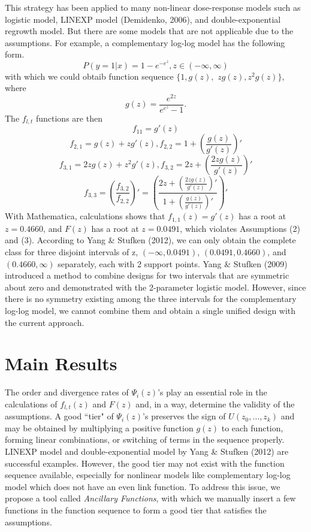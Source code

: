 \documentclass[12pt]{TD-CJS}
\begin{document}
 This strategy has been applied to many non-linear dose-response models such as logistic model, LINEXP model (Demidenko, 2006), and double-exponential regrowth model. But there are some models that are not applicable due to the assumptions. For example, a complementary log-log model has the following form. \[P(y=1|x) = 1-e^{-e^{z}}, z\in(-\infty,\infty)\] with which we could obtaib function sequence $\{1,g(z),$ $zg(z),z^2g(z)\}$, where \[g(z)=\frac{e^{2z}}{e^{e^z}-1}.\] 
 {\color{blue}The $f_{l,t}$ functions are then\[f_{11} = g'(z)\]
\[f_{2,1} = g(z)+zg'(z), f_{2,2} = 1+ (\frac{g(z)}{g'(z)})'\]
\[f_{3,1} = 2zg(z)+z^2g'(z), f_{3,2} = 2z+ (\frac{2zg(z)}{g'(z)})'\]
\[f_{3,3} = (\frac{ f_{3,2}}{ f_{2,2}})' =  (\frac{ 2z+ (\frac{2zg(z)}{g'(z)})'}{ 1+ (\frac{g(z)}{g'(z)})'})'  \]}
 With Mathematica, calculations shows that $f_{1,1}(z) = g'(z)$ has a root at $z=0.4660$, and $F(z)$ has a root at $z=0.0491$, which violates Assumptions (2) and (3). According to Yang \& Stufken (2012), we can only obtain the complete class for three disjoint intervals of z, $(-\infty, 0.0491)$, $(0.0491, 0.4660)$, and $(0.4660,\infty)$ separately, each with 2 support points. Yang \& Stufken (2009) introduced a method to combine designs for two intervals that are symmetric about zero and demonstrated with the 2-parameter logistic model. However, since there is no symmetry existing among the three intervals for the complementary log-log model, we cannot combine them and obtain a single unified design with the current approach.

 
\section{Main Results}\label{main}
The order and divergence rates of $\Psi_i(z)$'s play an essential role in the calculations of $f_{l,t}(z)$ and $F(z)$ and, in a way, determine the validity of the assumptions. A good ``tier" of $\Psi_i(z)$'s preserves the sign of $U(z_0,\ldots,z_k)$ and may be obtained by multiplying a positive function $g(z)$ to each function, forming linear combinations, or switching of terms in the sequence properly. LINEXP model and double-exponential model by Yang \& Stufken (2012) are successful examples. However, the good tier may not exist with the function sequence available, especially for nonlinear models like complementary log-log model which does not have an even link function. To address this issue, we propose a tool called \textit{Ancillary Functions}, with which we manually insert a few functions in the function sequence to form a good tier that satisfies the assumptions. 
\end{document}
